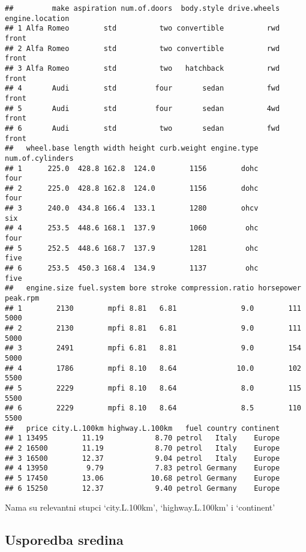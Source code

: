 \documentclass[
]{article}
\begin{document}
\begin{verbatim}
##         make aspiration num.of.doors  body.style drive.wheels engine.location
## 1 Alfa Romeo        std          two convertible          rwd           front
## 2 Alfa Romeo        std          two convertible          rwd           front
## 3 Alfa Romeo        std          two   hatchback          rwd           front
## 4       Audi        std         four       sedan          fwd           front
## 5       Audi        std         four       sedan          4wd           front
## 6       Audi        std          two       sedan          fwd           front
##   wheel.base length width height curb.weight engine.type num.of.cylinders
## 1      225.0  428.8 162.8  124.0        1156        dohc             four
## 2      225.0  428.8 162.8  124.0        1156        dohc             four
## 3      240.0  434.8 166.4  133.1        1280        ohcv              six
## 4      253.5  448.6 168.1  137.9        1060         ohc             four
## 5      252.5  448.6 168.7  137.9        1281         ohc             five
## 6      253.5  450.3 168.4  134.9        1137         ohc             five
##   engine.size fuel.system bore stroke compression.ratio horsepower peak.rpm
## 1        2130        mpfi 8.81   6.81               9.0        111     5000
## 2        2130        mpfi 8.81   6.81               9.0        111     5000
## 3        2491        mpfi 6.81   8.81               9.0        154     5000
## 4        1786        mpfi 8.10   8.64              10.0        102     5500
## 5        2229        mpfi 8.10   8.64               8.0        115     5500
## 6        2229        mpfi 8.10   8.64               8.5        110     5500
##   price city.L.100km highway.L.100km   fuel country continent
## 1 13495        11.19            8.70 petrol   Italy    Europe
## 2 16500        11.19            8.70 petrol   Italy    Europe
## 3 16500        12.37            9.04 petrol   Italy    Europe
## 4 13950         9.79            7.83 petrol Germany    Europe
## 5 17450        13.06           10.68 petrol Germany    Europe
## 6 15250        12.37            9.40 petrol Germany    Europe
\end{verbatim}

Nama su relevantni stupci `city.L.100km', `highway.L.100km' i
`continent'

\subsection{Usporedba sredina}\label{usporedba-sredina}
\end{document}
